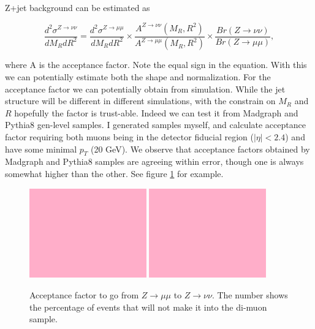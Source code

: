
Z+jet background can be estimated as

\begin{equation}
\dfrac{d^2 \sigma^{Z\rightarrow\nu\nu}}{d M_R d R^2} = 
\dfrac{d^2 \sigma^{Z\rightarrow\mu\mu}}{d M_R d R^2} \times
\dfrac{A^{Z\rightarrow\nu\nu}(M_R, R^2)}{A^{Z\rightarrow\mu\mu}(M_R, R^2)} \times
\dfrac{Br(Z\rightarrow\nu\nu)}{Br(Z\rightarrow\mu\mu)},
\end{equation}

where A is the acceptance factor.
Note the equal sign in the equation.  With this we can potentially
estimate both the shape and normalization.  For the acceptance
factor we can potentially obtain from simulation.  While the jet structure
will be different in different simulations, with the constrain on $M_R$ and
$R$ hopefully the factor is trust-able.  Indeed we can test it from {\sc Madgraph}
and {\sc Pythia8} gen-level samples.  I generated samples myself, and calculate
acceptance factor requiring both muons being in the detector fiducial region ($|\eta| < 2.4$)
and have some minimal $p_T$ (20 GeV).  We observe that acceptance factors obtained by
{\sc Madgraph} and {\sc Pythia8} samples are agreeing within error,
though one is always somewhat higher than the other.
See figure \ref{Figure_7671_AcceptanceFactor} for example.

\begin{figure}
\centering
\includegraphics[width=0.45\textwidth]{ToBeDrawn.png}
\includegraphics[width=0.45\textwidth]{ToBeDrawn.png}
\caption{Acceptance factor to go from $Z\rightarrow\mu\mu$ to $Z\rightarrow\nu\nu$.
The number shows the percentage of events that will not make it into the di-muon sample.}
\label{Figure_7671_AcceptanceFactor}
\end{figure}

